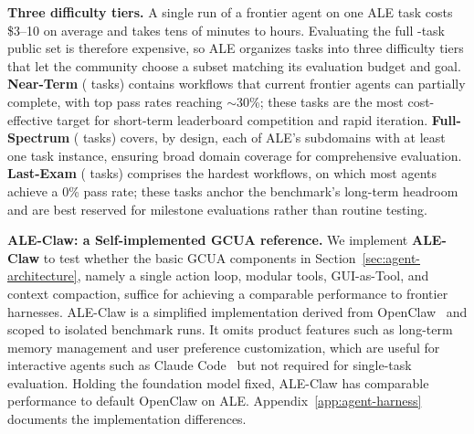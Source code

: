 \noindent \textbf{Three difficulty tiers.}
A single run of a frontier agent on one ALE task costs \$3--10 on average and takes tens of minutes to hours.
Evaluating the full \publictaskcount{}-task public set is therefore expensive, so ALE organizes tasks into three difficulty tiers that let the community choose a subset matching its evaluation budget and goal.
\textbf{Near-Term} (\neartermcount{} tasks) contains workflows that current frontier agents can partially complete, with top pass rates reaching $\sim$30\%; these tasks are the most cost-effective target for short-term leaderboard competition and rapid iteration.
\textbf{Full-Spectrum} (\fullspectrumcount{} tasks) covers, by design, each of ALE's \taskcount{} subdomains with at least one task instance, ensuring broad domain coverage for comprehensive evaluation.
\textcolor{lastexamred}{\textbf{Last-Exam}} (\lastexamcount{} tasks) comprises the hardest workflows, on which most agents achieve a 0\% pass rate; these tasks anchor the benchmark's long-term headroom and are best reserved for milestone evaluations rather than routine testing.

\noindent \textbf{ALE-Claw: a Self-implemented GCUA reference.}
We implement \textbf{ALE-Claw} to test whether the basic GCUA components in Section~\ref{sec:agent-architecture}, namely a single action loop, modular tools, GUI-as-Tool, and context compaction, suffice for achieving a comparable performance to frontier harnesses.
ALE-Claw is a simplified implementation derived from OpenClaw~\citep{openclaw2026agent} and scoped to isolated benchmark runs.
It omits product features such as long-term memory management and user preference customization, which are useful for interactive agents such as Claude Code~\citep{anthropic2025claudecode} but not required for single-task evaluation.
Holding the foundation model fixed, ALE-Claw has comparable performance to default OpenClaw on ALE. Appendix~\ref{app:agent-harness} documents the implementation differences.

